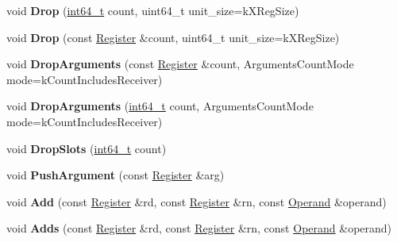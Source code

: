 \begin{DoxyCompactItemize}
void {\bfseries Drop} (\mbox{\hyperlink{classint64__t}{int64\+\_\+t}} count, uint64\+\_\+t unit\+\_\+size=k\+X\+Reg\+Size)
\item 
\mbox{\label{classv8_1_1internal_1_1TurboAssembler_a9a859bd72ab2e2a8528965321efc2f32}} 
void {\bfseries Drop} (const \mbox{\hyperlink{classv8_1_1internal_1_1Register}{Register}} \&count, uint64\+\_\+t unit\+\_\+size=k\+X\+Reg\+Size)
\item 
\mbox{\label{classv8_1_1internal_1_1TurboAssembler_a4b81e8b2adc12414ebfac16fd1971b93}} 
void {\bfseries Drop\+Arguments} (const \mbox{\hyperlink{classv8_1_1internal_1_1Register}{Register}} \&count, Arguments\+Count\+Mode mode=k\+Count\+Includes\+Receiver)
\item 
\mbox{\label{classv8_1_1internal_1_1TurboAssembler_a5ca0a1d112943a59ebc2f31470e7cf26}} 
void {\bfseries Drop\+Arguments} (\mbox{\hyperlink{classint64__t}{int64\+\_\+t}} count, Arguments\+Count\+Mode mode=k\+Count\+Includes\+Receiver)
\item 
\mbox{\label{classv8_1_1internal_1_1TurboAssembler_af43720cc70810f6f02049e6d9ee32aa8}} 
void {\bfseries Drop\+Slots} (\mbox{\hyperlink{classint64__t}{int64\+\_\+t}} count)
\item 
\mbox{\label{classv8_1_1internal_1_1TurboAssembler_a1eedfe39e723eec0af264030a1705981}} 
void {\bfseries Push\+Argument} (const \mbox{\hyperlink{classv8_1_1internal_1_1Register}{Register}} \&arg)
\item 
\mbox{\label{classv8_1_1internal_1_1TurboAssembler_a831bca33330f3a8b57c348ec34b97df6}} 
void {\bfseries Add} (const \mbox{\hyperlink{classv8_1_1internal_1_1Register}{Register}} \&rd, const \mbox{\hyperlink{classv8_1_1internal_1_1Register}{Register}} \&rn, const \mbox{\hyperlink{classv8_1_1internal_1_1Operand}{Operand}} \&operand)
\item 
\mbox{\label{classv8_1_1internal_1_1TurboAssembler_a334789c186844c3ca96164e5b01de050}} 
void {\bfseries Adds} (const \mbox{\hyperlink{classv8_1_1internal_1_1Register}{Register}} \&rd, const \mbox{\hyperlink{classv8_1_1internal_1_1Register}{Register}} \&rn, const \mbox{\hyperlink{classv8_1_1internal_1_1Operand}{Operand}} \&operand)

\end{DoxyCompactItemize}
